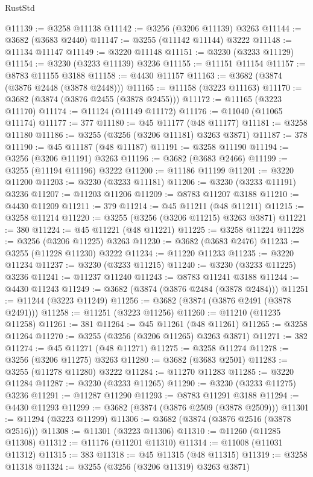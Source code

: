 \begin{lexlean}{RustStd}
\begin{coremodule}
@11139 := @3258 @11138
@11142 := @3256 (@3206 @11139) @3263
@11144 := @3682 (@3683 @2440)
@11147 := @3255 (@11142 @11144) @3222
@11148 := @11134 @11147
@11149 := @3220 @11148
@11151 := @3230 (@3233 @11129)
@11154 := @3230 (@3233 @11139) @3236
@11155 := @11151 @11154
@11157 := @8783 @11155 @3188
@11158 := @4430 @11157
@11163 := @3682 (@3874 (@3876 @2448 (@3878 @2448)))
@11165 := @11158 (@3223 @11163)
@11170 := @3682 (@3874 (@3876 @2455 (@3878 @2455)))
@11172 := @11165 (@3223 @11170)
@11174 := @11124 (@11149 @11172)
@11176 := @11040 (@11065 @11174)
@11177 := 377
@11180 := @45 @11177 (@48 @11177)
@11181 := @3258 @11180
@11186 := @3255 (@3256 (@3206 @11181) @3263 @3871)
@11187 := 378
@11190 := @45 @11187 (@48 @11187)
@11191 := @3258 @11190
@11194 := @3256 (@3206 @11191) @3263
@11196 := @3682 (@3683 @2466)
@11199 := @3255 (@11194 @11196) @3222
@11200 := @11186 @11199
@11201 := @3220 @11200
@11203 := @3230 (@3233 @11181)
@11206 := @3230 (@3233 @11191) @3236
@11207 := @11203 @11206
@11209 := @8783 @11207 @3188
@11210 := @4430 @11209
@11211 := 379
@11214 := @45 @11211 (@48 @11211)
@11215 := @3258 @11214
@11220 := @3255 (@3256 (@3206 @11215) @3263 @3871)
@11221 := 380
@11224 := @45 @11221 (@48 @11221)
@11225 := @3258 @11224
@11228 := @3256 (@3206 @11225) @3263
@11230 := @3682 (@3683 @2476)
@11233 := @3255 (@11228 @11230) @3222
@11234 := @11220 @11233
@11235 := @3220 @11234
@11237 := @3230 (@3233 @11215)
@11240 := @3230 (@3233 @11225) @3236
@11241 := @11237 @11240
@11243 := @8783 @11241 @3188
@11244 := @4430 @11243
@11249 := @3682 (@3874 (@3876 @2484 (@3878 @2484)))
@11251 := @11244 (@3223 @11249)
@11256 := @3682 (@3874 (@3876 @2491 (@3878 @2491)))
@11258 := @11251 (@3223 @11256)
@11260 := @11210 (@11235 @11258)
@11261 := 381
@11264 := @45 @11261 (@48 @11261)
@11265 := @3258 @11264
@11270 := @3255 (@3256 (@3206 @11265) @3263 @3871)
@11271 := 382
@11274 := @45 @11271 (@48 @11271)
@11275 := @3258 @11274
@11278 := @3256 (@3206 @11275) @3263
@11280 := @3682 (@3683 @2501)
@11283 := @3255 (@11278 @11280) @3222
@11284 := @11270 @11283
@11285 := @3220 @11284
@11287 := @3230 (@3233 @11265)
@11290 := @3230 (@3233 @11275) @3236
@11291 := @11287 @11290
@11293 := @8783 @11291 @3188
@11294 := @4430 @11293
@11299 := @3682 (@3874 (@3876 @2509 (@3878 @2509)))
@11301 := @11294 (@3223 @11299)
@11306 := @3682 (@3874 (@3876 @2516 (@3878 @2516)))
@11308 := @11301 (@3223 @11306)
@11310 := @11260 (@11285 @11308)
@11312 := @11176 (@11201 @11310)
@11314 := @11008 (@11031 @11312)
@11315 := 383
@11318 := @45 @11315 (@48 @11315)
@11319 := @3258 @11318
@11324 := @3255 (@3256 (@3206 @11319) @3263 @3871)

\end{coremodule}
\end{lexlean}
